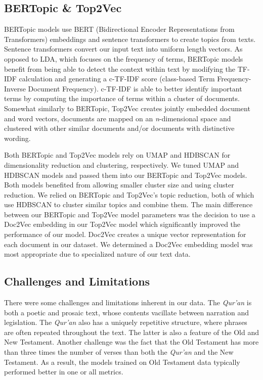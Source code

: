 \documentclass{article}
\begin{document}
    \subsection{BERTopic \& Top2Vec}
        BERTopic models use BERT (Bidirectional Encoder Representations from Transformers) embeddings and sentence transformers to create topics from texts. Sentence transformers convert our input text into uniform length vectors. As opposed to LDA, which focuses on the frequency of terms, BERTopic models benefit from being able to detect the context within text by modifying the TF-IDF calculation and generating a c-TF-IDF score (class-based Term Frequency-Inverse Document Frequency). c-TF-IDF is able to better identify important terms by computing the importance of terms within a cluster of documents. Somewhat similarly to BERTopic, Top2Vec creates jointly embedded document and word vectors, documents are mapped on an \textit{n}-dimensional space and clustered with other similar documents and/or documents with distinctive wording. 
        
        Both BERTopic and Top2Vec models rely on UMAP and HDBSCAN for dimensionality reduction and clustering, respectively. We tuned UMAP and HDBSCAN models and passed them into our BERTopic and Top2Vec models. Both models benefited from allowing smaller cluster size and using cluster reduction. We relied on BERTopic and Top2Vec's topic reduction, both of which use HDBSCAN to cluster similar topics and combine them. The main difference between our BERTopic and Top2Vec model parameters was the decision to use a Doc2Vec embedding in our Top2Vec model which significantly improved the performance of our model. Doc2Vec creates a unique vector representation for each document in our dataset. We determined a Doc2Vec embedding model was most appropriate due to specialized nature of our text data. 
        
    \subsection{Challenges and Limitations}
        There were some challenges and limitations inherent in our data. The \textit{Qur'an} is both a poetic and prosaic text, whose contents vacillate between narration and legislation. The \textit{Qur'an} also has a uniquely repetitive structure, where phrases are often repeated throughout the text. The latter is also a feature of the Old and New Testament. Another challenge was the fact that the Old Testament has more than three times the number of verses than both the \textit{Qur'an} and the New Testament. As a result, the models trained on Old Testament data typically performed better in one or all metrics. 
\end{document}
